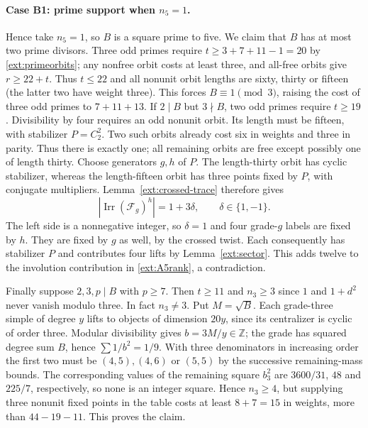\documentclass[11pt]{amsart}
\numberwithin{equation}{section}
\theoremstyle{definition}
\theoremstyle{plain}
\DeclareMathOperator{\Irr}{Irr}
\begin{document}
\paragraph{Case B1: prime support when $n_5=1$.}\label{ext:neutral-B1}
Hence take $n_5=1$, so $B$ is a square prime to five. We claim that
$B$ has at most two prime divisors. Three odd primes require
$t\ge3+7+11-1=20$ by \eqref{ext:primeorbits}; any nonfree orbit
costs at least three, and all-free orbits give $r\ge22+t$.
Thus $t\le22$ and all nonunit orbit lengths are sixty, thirty or fifteen
(the latter two have weight three). This forces $B\equiv1\pmod3$,
raising the cost of three odd primes to $7+11+13$.
If $2\mid B$ but $3\nmid B$, two odd primes require $t\ge19$.
Divisibility by four requires an odd nonunit orbit. Its length must
be fifteen, with stabilizer $P=C_2^2$. Two such orbits already cost
six in weights and three in parity. Thus there is exactly one;
all remaining orbits are free except possibly one of length thirty. Choose generators $g,h$ of $P$. The length-thirty orbit has cyclic
stabilizer, whereas the length-fifteen orbit has three points fixed
by $P$, with conjugate multipliers. Lemma~\ref{ext:crossed-trace}
therefore gives
\[
 |\Irr(\mathcal F_g)^h|=1+3\delta,\qquad \delta\in\{1,-1\}.
\]
The left side is a nonnegative integer, so $\delta=1$ and four
grade-$g$ labels are fixed by $h$. They are fixed by $g$ as well,
by the crossed twist. Each consequently has stabilizer $P$ and
contributes four lifts by Lemma~\ref{ext:sector}. This adds twelve
to the involution contribution in \eqref{ext:A5rank}, a contradiction.

Finally suppose $2,3,p\mid B$ with $p\ge7$. Then $t\ge11$ and
$n_3\ge3$ since $1$ and $1+d^2$ never vanish modulo three.
In fact $n_3\ne3$. Put $M=\sqrt B$. Each grade-three simple of
degree $y$ lifts to objects of dimension $20y$, since its centralizer
is cyclic of order three. Modular divisibility gives $b=3M/y\in\mathbb Z$;
the grade has squared degree sum $B$, hence $\sum 1/b^2=1/9$.
With three denominators in increasing order the first two must be
$(4,5),(4,6)$ or $(5,5)$ by the successive remaining-mass bounds.
The corresponding values of the remaining square $b_3^2$ are
$3600/31$, $48$ and $225/7$, respectively, so none is an integer
square. Hence $n_3\ge4$, but supplying three
nonunit fixed points in the table costs at least $8+7=15$ in weights,
more than $44-19-11$. This proves
the claim.
\end{document}
